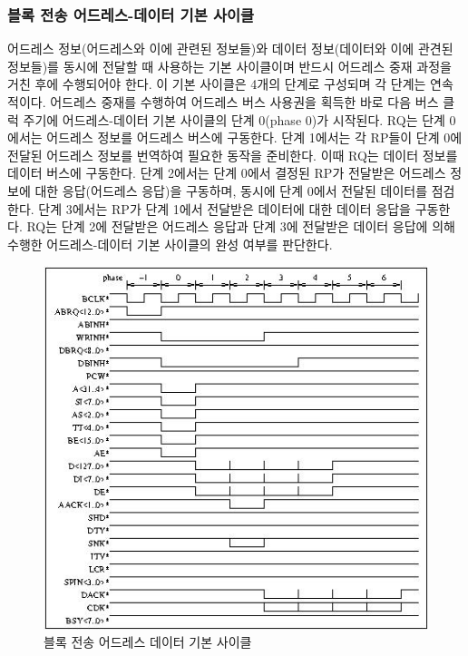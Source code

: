 \subsubsection{블록 전송 어드레스-데이터 기본 사이클}
어드레스 정보(어드레스와 이에 관련된 정보들)와 데이터 정보(데이터와 이에 관견된 정보들)를
동시에 전달할 때 사용하는
기본 사이클이며 반드시 어드레스 중재 과정을 거친 후에 수행되어야 한다.
이 기본 사이클은 4개의 단계로 구성되며 각 단계는 연속적이다.
어드레스 중재를 수행하여 어드레스 버스 사용권을 획득한 바로 다음 버스 클럭 주기에 어드레스-데이터 기본 사이클의
단계 0(phase 0)가 시작된다. RQ는 단계 0에서는 어드레스 정보를
어드레스 버스에 구동한다. 단계 1에서는 각 RP들이 단계 0에 전달된 어드레스 정보를 번역하여
필요한 동작을 준비한다. 이때 RQ는 데이터 정보를 데이터 버스에 구동한다.
단계 2에서는 단계 0에서 결정된 RP가 전달받은 어드레스 정보에 대한 응답(어드레스 응답)을 구동하며,
동시에 단계 0에서 전달된 데이터를 점검한다.
단계 3에서는 RP가 단계 1에서 전달받은 데이터에 대한 데이터 응답을 구동한다.
RQ는 단계 2에 전달받은 어드레스 응답과 단계 3에 전달받은 데이터 응답에 의해
수행한 어드레스-데이터 기본 사이클의 완성 여부를 판단한다.
%
\begin{figure}[hp]
   \centerline{\includegraphics{ch3/FIG/block-add-data-basic.jpg}}
   \caption{블록 전송 어드레스 데이터 기본 사이클}\label{figure:block-add-data-basic}
\end{figure}
